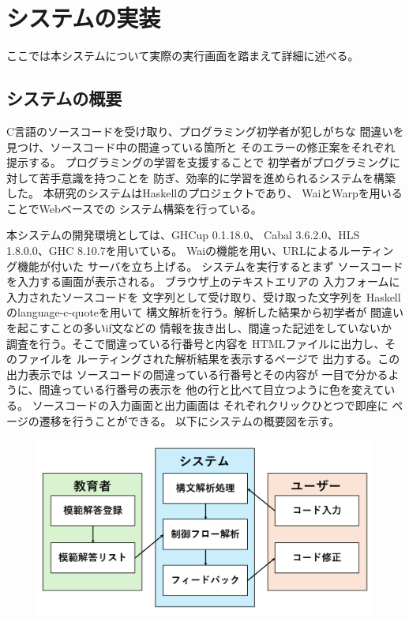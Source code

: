 \documentclass{csspaper}
\begin{document}
   \chapter{システムの実装}
   ここでは本システムについて実際の実行画面を踏まえて詳細に述べる。
      \section{システムの概要}
      C言語のソースコードを受け取り、プログラミング初学者が犯しがちな
      間違いを見つけ、ソースコード中の間違っている箇所と
      そのエラーの修正案をそれぞれ提示する。
      プログラミングの学習を支援することで
      初学者がプログラミングに対して苦手意識を持つことを
      防ぎ、効率的に学習を進められるシステムを構築した。
      本研究のシステムはHaskellのプロジェクトであり、
      WaiとWarpを用いることでWebベースでの
      システム構築を行っている。

      本システムの開発環境としては、GHCup 0.1.18.0、
      Cabal 3.6.2.0、HLS 1.8.0.0、GHC 8.10.7を用いている。
      Waiの機能を用い、URLによるルーティング機能が付いた
      サーバを立ち上げる。
      システムを実行するとまず
      ソースコードを入力する画面が表示される。
      ブラウザ上のテキストエリアの
      入力フォームに入力されたソースコードを
      文字列として受け取り、受け取った文字列を
      Haskellのlanguage-c-quoteを用いて
      構文解析を行う。解析した結果から初学者が
      間違いを起こすことの多いif文などの
      情報を抜き出し、間違った記述をしていないか
      調査を行う。そこで間違っている行番号と内容を
      HTMLファイルに出力し、そのファイルを
      ルーティングされた解析結果を表示するページで
      出力する。この出力表示では
      ソースコードの間違っている行番号とその内容が
      一目で分かるように、間違っている行番号の表示を
      他の行と比べて目立つように色を変えている。
      ソースコードの入力画面と出力画面は
      それぞれクリックひとつで即座に
      ページの遷移を行うことができる。
      以下にシステムの概要図を示す。

      \begin{figure}[h]
         \includegraphics[width=15cm]{system.png}
      \end{figure}
\end{document}
